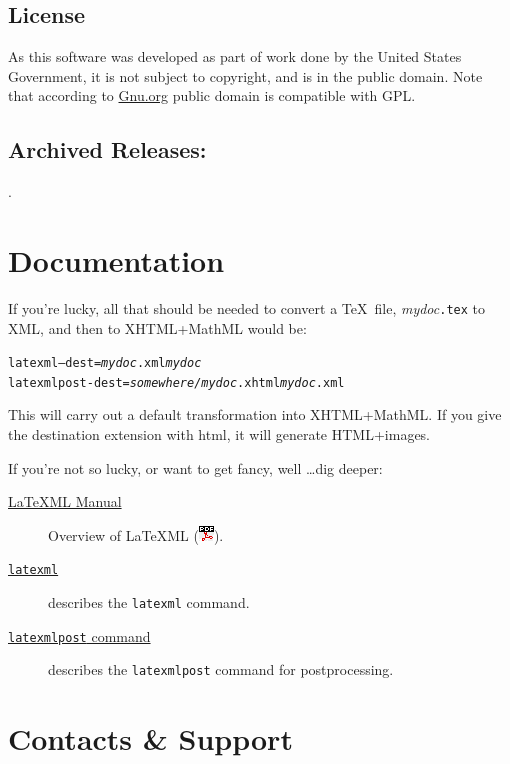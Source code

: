 \documentclass{article}
\newcommand{\PDFIcon}{\includegraphics{pdf}}
\begin{document}
\subsection{License}\label{license}
As this software was developed as part of work done by the
United States Government, it is not subject to copyright,
and is in the public domain.
Note that according to
\href{http://www.gnu.org/licences/license-list.html#PublicDomain}{Gnu.org}
public domain is compatible with GPL.

\subsection{Archived Releases:}\label{archive}
\AllReleases.

\section{Documentation}\label{docs}
If you're lucky, all that should be needed to convert
a \TeX\ file, \textit{mydoc}\texttt{.tex} to XML, and
then to XHTML+MathML would be:
\begin{alltt}
   latexml --dest=\textit{mydoc}.xml \textit{mydoc}
   latexmlpost -dest=\textit{somewhere/mydoc}.xhtml \textit{mydoc}.xml
\end{alltt}
This will carry out a default transformation into XHTML+MathML.  If you
give the destination extension with html, it will generate HTML+images.

If you're not so lucky, or want to get fancy, well \ldots dig deeper:
\begin{description}
\item[\href{manual/index.xhtml}{LaTeXML Manual}]
    Overview of LaTeXML (\href{manual.pdf}{\PDFIcon}).
\item[\href{manual/commands/latexml.xhtml}{\texttt{latexml}}]
    describes the \texttt{latexml} command.
\item[\href{manual/commands/latexmlpost.xhtml}{\texttt{latexmlpost} command}]
   describes the \texttt{latexmlpost} command for postprocessing.
\end{description}


\section{Contacts \& Support}\label{contact}
\end{document}
